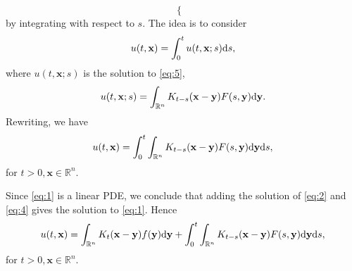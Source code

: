 \begin{sol}
\begin{equation}
\begin{cases}
  \end{cases}
\end{equation}
by integrating with respect to $s$.
The idea is to consider
\begin{displaymath}
  u(t, \mathbf{x}) = \int_0^tu(t, \mathbf{x};s)\mathrm{d} s,
\end{displaymath}
where $u(t, \mathbf{x}; s)$ is the solution to \eqref{eq:5},
\begin{displaymath}
  u(t, \mathbf{x};s) = \int_{\mathbb{R}^n}K_{t-s}(\mathbf{x}-\mathbf{y})F(s, \mathbf{y})\mathrm{d}\mathbf{y}.
\end{displaymath}
Rewriting, we have
\begin{equation}
  \label{eq:6}
  u(t, \mathbf{x}) = \int_0^t\int_{\mathbb{R}^n}K_{t-s}(\mathbf{x}-\mathbf{y})F(s, \mathbf{y})\mathrm{d}\mathbf{y}\mathrm{d} s,
\end{equation}
for $t>0, \mathbf{x}\in\mathbb{R}^n$.
\end{sol}
Since \eqref{eq:1} is a linear PDE,
we conclude that adding the solution of \eqref{eq:2} and
\eqref{eq:4} gives the solution to \eqref{eq:1}.
Hence
\begin{displaymath}
  u(t, \mathbf{x}) = \int_{\mathbb{R}^n}K_t(\mathbf{x}-\mathbf{y})f(\mathbf{y})\mathrm{d}\mathbf{y}
  + \int_0^t\int_{\mathbb{R}^n}K_{t-s}(\mathbf{x}-\mathbf{y})F(s, \mathbf{y})\mathrm{d}\mathbf{y}\mathrm{d} s,
\end{displaymath}
for $t>0, \mathbf{x}\in\mathbb{R}^n$.
